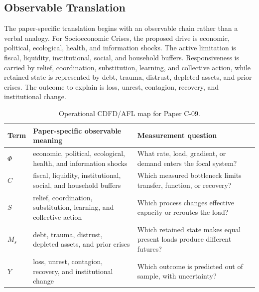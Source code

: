 \documentclass[11pt,a4paper]{article}
\begin{document}
\subsection{Observable Translation}

The paper-specific translation begins with an observable chain rather than a
verbal analogy. For Socioeconomic Crises, the proposed drive is economic, political, ecological, health, and information shocks.
The active limitation is fiscal, liquidity, institutional, social, and household buffers. Responsiveness is carried by
relief, coordination, substitution, learning, and collective action, while retained state is represented by
debt, trauma, distrust, depleted assets, and prior crises. The outcome to explain is loss, unrest, contagion, recovery, and institutional change.

\begin{table}[htbp]
\centering
\small
\caption{Operational CDFD/AFL map for Paper C-09.}
\begin{tabularx}{\textwidth}{|l|X|X|}
\hline
\textbf{Term} & \textbf{Paper-specific observable meaning} & \textbf{Measurement question} \\
\hline
$\Phi$ & economic, political, ecological, health, and information shocks & What rate, load, gradient, or demand enters the focal system? \\
\hline
$C$ & fiscal, liquidity, institutional, social, and household buffers & Which measured bottleneck limits transfer, function, or recovery? \\
\hline
$S$ & relief, coordination, substitution, learning, and collective action & Which process changes effective capacity or reroutes the load? \\
\hline
$M_s$ & debt, trauma, distrust, depleted assets, and prior crises & Which retained state makes equal present loads produce different futures? \\
\hline
$Y$ & loss, unrest, contagion, recovery, and institutional change & Which outcome is predicted out of sample, with uncertainty? \\
\hline
\end{tabularx}
\end{table}
\end{document}
